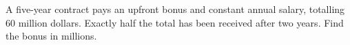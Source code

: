 A five-year contract pays an upfront bonus and constant annual salary, totalling 60 million dollars. Exactly half the total has been received after two years. Find the bonus in millions.
